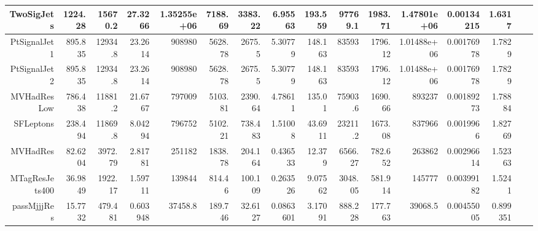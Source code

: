 \begin{table}[ht!]
\begin{center}
{\begin{tabular}{ r ||  r  r  r  r  r  r  r  r  r  r || r r r r r |}
TwoSigJets & 1224.28 & 15670.2 & 27.3266 & 1.35255e+06 & 7188.69 & 3383.22 & 6.95563 & 193.559 & 97769.1 & 1983.71 &1.47801e+06&0.00134215 & 1.6317\tabularnewline \hline
PtSignalJet1 & 895.835 & 12934.8 & 23.2614 & 908980 & 5628.78 & 2675.5 & 5.30779 & 148.163 & 83593 & 1796.12 &1.01488e+06&0.00176978 & 1.7829\tabularnewline \hline
PtSignalJet2 & 895.835 & 12934.8 & 23.2614 & 908980 & 5628.78 & 2675.5 & 5.30779 & 148.163 & 83593 & 1796.12 &1.01488e+06&0.00176978 & 1.7829\tabularnewline \hline
MVHadResLow & 786.438 & 11881.2 & 21.6767 & 797009 & 5103.81 & 2390.64 & 4.78611 & 135.01 & 75903.6 & 1690.66&893237&0.00189273 & 1.78884\tabularnewline \hline
SFLeptons & 238.494 & 11869.8 & 8.04294 & 796752 & 5102.21 & 738.483 & 1.51008 & 43.6911 & 23211.2 & 1673.08&837966&0.0019966 & 1.82769\tabularnewline \hline
MVHadRes & 82.6204 & 3972.79 & 2.81781 & 251182 & 1838.78 & 204.164 & 0.436533 & 12.379 & 6566.27 & 782.652&263862&0.00296614 & 1.52363\tabularnewline \hline
MTagResJets400 & 36.9849 & 1922.17 & 1.59711 & 139844 & 814.46 & 100.109 & 0.263526 & 9.07562 & 3048.05 & 581.914&145777&0.00399182 & 1.5241\tabularnewline \hline
passMjjjRes & 15.7732 & 479.481 & 0.603948 & 37458.8 & 189.746 & 32.6127 & 0.0863601 & 3.17091 & 888.228 & 177.763&39068.5&0.00455005 & 0.899351\tabularnewline \hline
\end{tabular}

}
\end{center}
\end{table}


